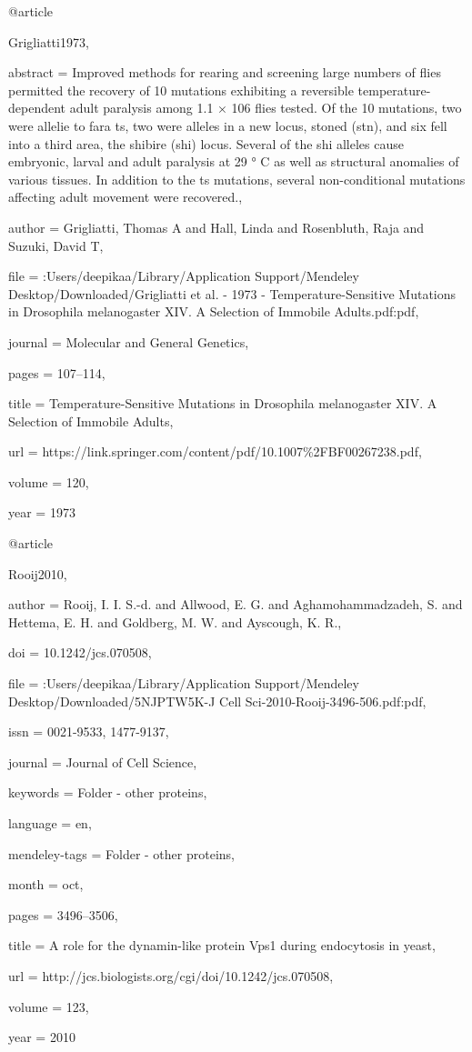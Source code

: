@article{Grigliatti1973,

abstract = {Improved methods for rearing and screening large numbers of flies permitted the recovery of 10 mutations exhibiting a reversible temperature-dependent adult paralysis among 1.1 × 106 flies tested. Of the 10 mutations, two were allelie to fara ts, two were alleles in a new locus, stoned (stn), and six fell into a third area, the shibire (shi) locus. Several of the shi alleles cause embryonic, larval and adult paralysis at 29 ° C as well as structural anomalies of various tissues. In addition to the ts mutations, several non-conditional mutations affecting adult movement were recovered.},

author = {Grigliatti, Thomas A and Hall, Linda and Rosenbluth, Raja and Suzuki, David T},

file = {:Users/deepikaa/Library/Application Support/Mendeley Desktop/Downloaded/Grigliatti et al. - 1973 - Temperature-Sensitive Mutations in Drosophila melanogaster XIV. A Selection of Immobile Adults.pdf:pdf},

journal = {Molecular and General Genetics},

pages = {107--114},

title = {{Temperature-Sensitive Mutations in Drosophila melanogaster XIV. A Selection of Immobile Adults}},

url = {https://link.springer.com/content/pdf/10.1007{\%}2FBF00267238.pdf},

volume = {120},

year = {1973}

}

@article{Rooij2010,

author = {Rooij, I. I. S.-d. and Allwood, E. G. and Aghamohammadzadeh, S. and Hettema, E. H. and Goldberg, M. W. and Ayscough, K. R.},

doi = {10.1242/jcs.070508},

file = {:Users/deepikaa/Library/Application Support/Mendeley Desktop/Downloaded/5NJPTW5K-J Cell Sci-2010-Rooij-3496-506.pdf:pdf},

issn = {0021-9533, 1477-9137},

journal = {Journal of Cell Science},

keywords = {Folder - other proteins},

language = {en},

mendeley-tags = {Folder - other proteins},

month = {oct},

pages = {3496--3506},

title = {{A role for the dynamin-like protein Vps1 during endocytosis in yeast}},

url = {http://jcs.biologists.org/cgi/doi/10.1242/jcs.070508},

volume = {123},

year = {2010}

}


